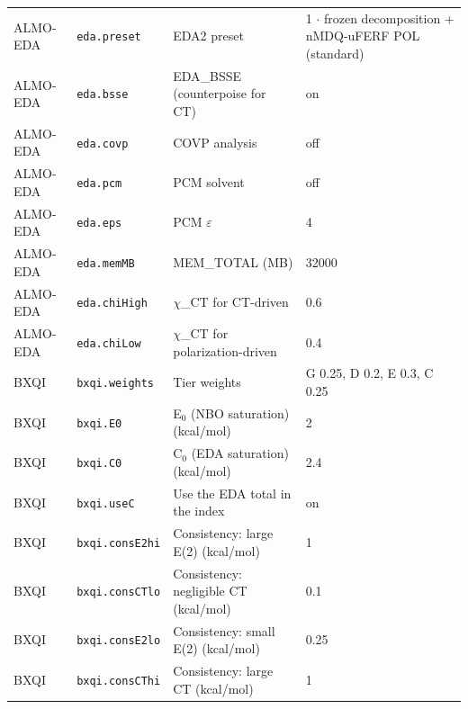 {\begin{longtable}{llp{4.2cm}l}
ALMO-EDA & \texttt{eda.preset} & EDA2 preset & \parbox[t]{5.0cm}{\raggedright 1 $\cdot$ frozen decomposition + nMDQ-uFERF POL (standard)}\\
ALMO-EDA & \texttt{eda.bsse} & EDA\_BSSE (counterpoise for CT) & \parbox[t]{5.0cm}{\raggedright on}\\
ALMO-EDA & \texttt{eda.covp} & COVP analysis & \parbox[t]{5.0cm}{\raggedright off}\\
ALMO-EDA & \texttt{eda.pcm} & PCM solvent & \parbox[t]{5.0cm}{\raggedright off}\\
ALMO-EDA & \texttt{eda.eps} & PCM $\varepsilon$ & \parbox[t]{5.0cm}{\raggedright 4}\\
ALMO-EDA & \texttt{eda.memMB} & MEM\_TOTAL (MB) & \parbox[t]{5.0cm}{\raggedright 32000}\\
ALMO-EDA & \texttt{eda.chiHigh} & $\chi$\_CT for CT-driven & \parbox[t]{5.0cm}{\raggedright 0.6}\\
ALMO-EDA & \texttt{eda.chiLow} & $\chi$\_CT for polarization-driven & \parbox[t]{5.0cm}{\raggedright 0.4}\\
BXQI & \texttt{bxqi.weights} & Tier weights & \parbox[t]{5.0cm}{\raggedright G 0.25, D 0.2, E 0.3, C 0.25}\\
BXQI & \texttt{bxqi.E0} & E$_0$ (NBO saturation) (kcal/mol) & \parbox[t]{5.0cm}{\raggedright 2}\\
BXQI & \texttt{bxqi.C0} & C$_0$ (EDA saturation) (kcal/mol) & \parbox[t]{5.0cm}{\raggedright 2.4}\\
BXQI & \texttt{bxqi.useC} & Use the EDA total in the index & \parbox[t]{5.0cm}{\raggedright on}\\
BXQI & \texttt{bxqi.consE2hi} & Consistency: large E(2) (kcal/mol) & \parbox[t]{5.0cm}{\raggedright 1}\\
BXQI & \texttt{bxqi.consCTlo} & Consistency: negligible CT (kcal/mol) & \parbox[t]{5.0cm}{\raggedright 0.1}\\
BXQI & \texttt{bxqi.consE2lo} & Consistency: small E(2) (kcal/mol) & \parbox[t]{5.0cm}{\raggedright 0.25}\\
BXQI & \texttt{bxqi.consCThi} & Consistency: large CT (kcal/mol) & \parbox[t]{5.0cm}{\raggedright 1}\\
\end{longtable}}
